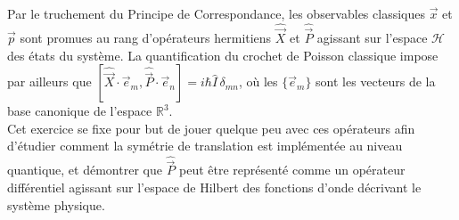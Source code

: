 Par le truchement du Principe de Correspondance, les observables classiques $\vec x$ et $\vec p$ sont promues au rang d'opérateurs hermitiens $\hat{\vec X}$ et $\hat{\vec P}$ agissant sur l'espace $\mathcal{H}$ des états du système. La quantification du crochet de Poisson classique impose par ailleurs que $[\hat{\vec X}\cdot \vec e_m,\hat{\vec P} \cdot \vec e_n] = i\hbar \hat I\,\delta_{mn}$, où les $\lbrace \vec e_m \rbrace$ sont les vecteurs de la base canonique de l'espace $\mathbb R^3$. \\

Cet exercice se fixe pour but de jouer quelque peu avec ces opérateurs afin d'étudier comment la symétrie de translation est implémentée au niveau quantique, et démontrer que $\hat{\vec P}$ peut être représenté comme un opérateur différentiel agissant sur l'espace de Hilbert des fonctions d'onde décrivant le système physique.
